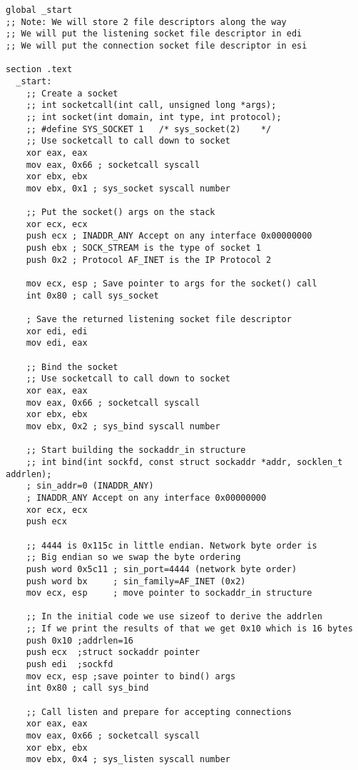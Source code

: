 \documentclass[11pt]{article}
\begin{document}
\begin{verbatim}
global _start
;; Note: We will store 2 file descriptors along the way
;; We will put the listening socket file descriptor in edi
;; We will put the connection socket file descriptor in esi

section .text
  _start:
    ;; Create a socket
    ;; int socketcall(int call, unsigned long *args);
    ;; int socket(int domain, int type, int protocol);
    ;; #define SYS_SOCKET 1   /* sys_socket(2)    */
    ;; Use socketcall to call down to socket
    xor eax, eax
    mov eax, 0x66 ; socketcall syscall
    xor ebx, ebx
    mov ebx, 0x1 ; sys_socket syscall number

    ;; Put the socket() args on the stack
    xor ecx, ecx
    push ecx ; INADDR_ANY Accept on any interface 0x00000000
    push ebx ; SOCK_STREAM is the type of socket 1
    push 0x2 ; Protocol AF_INET is the IP Protocol 2

    mov ecx, esp ; Save pointer to args for the socket() call
    int 0x80 ; call sys_socket

    ; Save the returned listening socket file descriptor
    xor edi, edi
    mov edi, eax

    ;; Bind the socket
    ;; Use socketcall to call down to socket
    xor eax, eax
    mov eax, 0x66 ; socketcall syscall
    xor ebx, ebx
    mov ebx, 0x2 ; sys_bind syscall number

    ;; Start building the sockaddr_in structure
    ;; int bind(int sockfd, const struct sockaddr *addr, socklen_t addrlen);
    ; sin_addr=0 (INADDR_ANY)
    ; INADDR_ANY Accept on any interface 0x00000000
    xor ecx, ecx
    push ecx

    ;; 4444 is 0x115c in little endian. Network byte order is
    ;; Big endian so we swap the byte ordering
    push word 0x5c11 ; sin_port=4444 (network byte order)
    push word bx     ; sin_family=AF_INET (0x2)
    mov ecx, esp     ; move pointer to sockaddr_in structure

    ;; In the initial code we use sizeof to derive the addrlen
    ;; If we print the results of that we get 0x10 which is 16 bytes
    push 0x10 ;addrlen=16
    push ecx  ;struct sockaddr pointer
    push edi  ;sockfd
    mov ecx, esp ;save pointer to bind() args
    int 0x80 ; call sys_bind

    ;; Call listen and prepare for accepting connections
    xor eax, eax
    mov eax, 0x66 ; socketcall syscall
    xor ebx, ebx
    mov ebx, 0x4 ; sys_listen syscall number


\end{verbatim}
\end{document}
